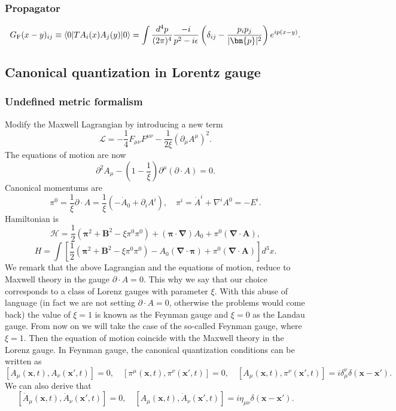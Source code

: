\subsubsection{Propagator}
\[G_{\rm F}(x-y)_{ij} \equiv \langle 0 |T A_i(x) A_j(y) | 0 \rangle = \int \frac{d^4p}{(2\pi)^4} \frac{-i}{p^2-i\epsilon} \left(\delta_{ij} - \frac{p_ip_j}{|\bm{p}|^2}\right) e^{ip(x-y)}.\]

\subsection{Canonical quantization in Lorentz gauge}
\subsubsection{Undefined metric formalism}
Modify the Maxwell Lagrangian by introducing a new term
\[\mathcal{L} = -\frac{1}{4} F_{\mu\nu}F^{\mu\nu} - \frac{1}{2\xi} (\partial_{\mu} A^{\mu})^2.\]
The equations of motion are now
\[\partial^2 A_{\mu} - (1-\frac{1}{\xi})\partial^{\mu}(\partial \cdot A) = 0.\]
Canonical momentums are
\[\pi^0 = \frac{1}{\xi} \partial \cdot A = \frac{1}{\xi}(-\dot{A}_0 + \partial_i A^i) , \quad \pi^i = \dot{A}^i + \nabla^i A^0 = -E^i.\]
Hamiltonian is
\[\mathcal{H} = \frac{1}{2}(\bm{\pi}^2 + \bm{B}^2 - \xi \pi^0 \pi^0) + (\bm{\pi} \cdot \bm{\nabla}) A_0 + \pi^0 (\bm{\nabla} \cdot \bm{A}),\]
\[H =  \int \left[ \frac{1}{2}(\bm{\pi}^2 + \bm{B}^2 - \xi \pi^0 \pi^0) -A_0(\bm{\nabla} \cdot \bm{\pi}) + \pi^0 (\bm{\nabla} \cdot \bm{A}) \right] d^3x .\]
We remark that the above Lagrangian and the equations of motion, reduce to Maxwell theory in the gauge $\partial \cdot A = 0$. This why we say that our choice corresponds to a class of Lorenz gauges with parameter $\xi$. With this abuse of language (in fact we are not setting $\partial \cdot A = 0$, otherwise the problems would come back) the value of $\xi=1$ is known as the Feynman gauge and $\xi=0$ as the Landau gauge. From now on we will take the case of the so-called Feynman gauge, where $\xi=1$. Then the equation of motion coincide with the Maxwell theory in the Lorenz gauge. In Feynman gauge, the canonical quantization conditions can be written as
\[[A_{\mu}(\bm{x},t),A_{\nu}(\bm{x}',t)] = 0 , \quad [\pi^{\mu}(\bm{x},t),\pi^{\nu}(\bm{x}',t)] = 0 , \quad [A_{\mu}(\bm{x},t),\pi^{\nu}(\bm{x}',t)] = i\delta^{\nu}_{\mu} \delta(\bm{x}-\bm{x}').\]
We can also derive that
\[[\dot{A}_{\mu}(\bm{x},t),\dot{A}_{\nu}(\bm{x}',t)] = 0 , \quad [A_{\mu}(\bm{x},t),\dot{A}_{\nu}(\bm{x}',t)] = i\eta_{\mu\nu} \delta(\bm{x}-\bm{x}').\]

